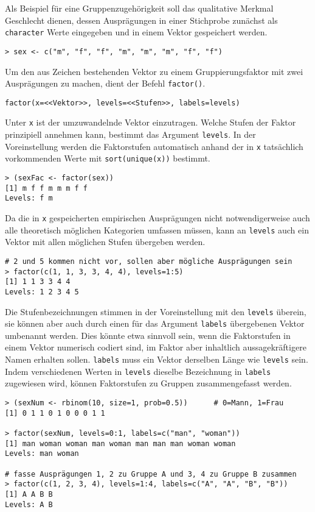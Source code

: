 Als Beispiel für eine Gruppenzugehörigkeit soll das qualitative Merkmal Geschlecht dienen, dessen Ausprägungen in einer Stichprobe zunächst als \lstinline!character! Werte eingegeben und in einem Vektor gespeichert werden.
\begin{lstlisting}
> sex <- c("m", "f", "f", "m", "m", "m", "f", "f")
\end{lstlisting}

Um den aus Zeichen bestehenden Vektor zu einem Gruppierungsfaktor mit zwei Ausprägungen zu machen, dient der Befehl \lstinline!factor()!.
\begin{lstlisting}
factor(x=<<Vektor>>, levels=<<Stufen>>, labels=levels)
\end{lstlisting}

Unter \lstinline!x! ist der umzuwandelnde Vektor einzutragen. Welche Stufen der Faktor prinzipiell annehmen kann, bestimmt das Argument \lstinline!levels!. In der Voreinstellung werden die Faktorstufen automatisch anhand der in \lstinline!x! tatsächlich vorkommenden Werte mit \lstinline!sort(unique(x))! bestimmt.
\begin{lstlisting}
> (sexFac <- factor(sex))
[1] m f f m m m f f
Levels: f m
\end{lstlisting}

Da die in \lstinline!x! gespeicherten empirischen Ausprägungen nicht notwendigerweise auch alle theoretisch möglichen Kategorien umfassen müssen, kann an \lstinline!levels! auch ein Vektor mit allen möglichen Stufen übergeben werden.
\begin{lstlisting}
# 2 und 5 kommen nicht vor, sollen aber mögliche Ausprägungen sein
> factor(c(1, 1, 3, 3, 4, 4), levels=1:5)
[1] 1 1 3 3 4 4
Levels: 1 2 3 4 5
\end{lstlisting}

Die Stufenbezeichnungen stimmen in der Voreinstellung mit den \lstinline!levels! überein, sie können aber auch durch einen für das Argument \lstinline!labels! übergebenen Vektor umbenannt werden. Dies könnte etwa sinnvoll sein, wenn die Faktorstufen in einem Vektor numerisch codiert sind, im Faktor aber inhaltlich aussagekräftigere Namen erhalten sollen. \lstinline!labels! muss ein Vektor derselben Länge wie \lstinline!levels! sein. Indem verschiedenen Werten in \lstinline!levels! dieselbe Bezeichnung in \lstinline!labels! zugewiesen wird, können Faktorstufen zu Gruppen zusammengefasst werden.
\begin{lstlisting}
> (sexNum <- rbinom(10, size=1, prob=0.5))      # 0=Mann, 1=Frau
[1] 0 1 1 0 1 0 0 0 1 1

> factor(sexNum, levels=0:1, labels=c("man", "woman"))
[1] man woman woman man woman man man man woman woman
Levels: man woman

# fasse Ausprägungen 1, 2 zu Gruppe A und 3, 4 zu Gruppe B zusammen
> factor(c(1, 2, 3, 4), levels=1:4, labels=c("A", "A", "B", "B"))
[1] A A B B
Levels: A B
\end{lstlisting}

